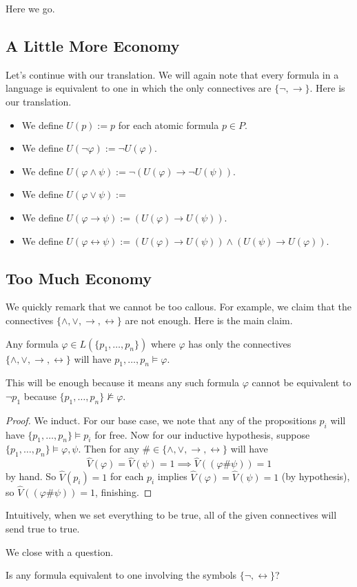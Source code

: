 
Here we go.

\subsection{A Little More Economy}
Let's continue with our translation. We will again note that every formula in a language is equivalent to one in which the only connectives are $\{\lnot,\to\}$. Here is our translation.
\begin{itemize}
	\item We define $U(p):=p$ for each atomic formula $p\in P$.
	\item We define $U(\lnot\varphi):=\lnot U(\varphi)$.
	\item We define $U(\varphi\land\psi):=\lnot(U(\varphi)\to\lnot U(\psi))$.
	\item We define $U(\varphi\lor\psi):=$
	\item We define $U(\varphi\to\psi):=(U(\varphi)\to U(\psi))$.
	\item We define $U(\varphi\leftrightarrow\psi):=(U(\varphi)\to U(\psi))\land(U(\psi)\to U(\varphi))$.
\end{itemize}

\subsection{Too Much Economy}
We quickly remark that we cannot be too callous. For example, we claim that the connectives $\{\land,\lor,\to,\leftrightarrow\}$ are not enough. Here is the main claim.
\begin{lemma}
	Any formula $\varphi\in L(\{p_1,\ldots,p_n\})$ where $\varphi$ has only the connectives $\{\land,\lor,\to,\leftrightarrow\}$ will have $p_1,\ldots,p_n\models\varphi$.
\end{lemma}
This will be enough because it means any such formula $\varphi$ cannot be equivalent to $\lnot p_1$ because $\{p_1,\ldots,p_n\}\nvDash\varphi$.
\begin{proof}
	We induct. For our base case, we note that any of the propositions $p_i$ will have $\{p_1,\ldots,p_n\}\models p_i$ for free. Now for our inductive hypothesis, suppose $\{p_1,\ldots,p_n\}\models\varphi,\psi$. Then for any $\#\in\{\land,\lor,\to,\leftrightarrow\}$ will have
	\[\hat V(\varphi)=\hat V(\psi)=1\implies\hat V((\varphi\#\psi))=1\]
	by hand. So $\hat V(p_i)=1$ for each $p_i$ implies $\hat V(\varphi)=\hat V(\psi)=1$ (by hypothesis), so $\hat V((\varphi\#\psi))=1$, finishing.
\end{proof}
\begin{remark}
	Intuitively, when we set everything to be true, all of the given connectives will send true to true.
\end{remark}
We close with a question.
\begin{ques}
	Is any formula equivalent to one involving the symbols $\{\lnot,\leftrightarrow\}$?
\end{ques}

